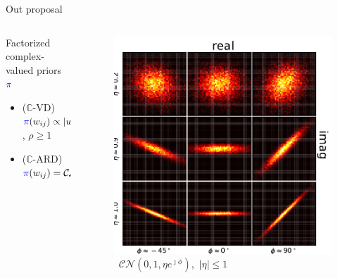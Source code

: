 \documentclass{beamer}
\newcommand{\cplx}{\mathbb{C}}
\begin{document}
\begin{frame}[c]{\insertsection}{Out proposal}
  \pause
  \bigskip
  \begin{columns}[T]
    \begin{column}{0.60\linewidth}
      Factorized complex-valued priors ${\color{blue} \pi}$
      \begin{itemize}
        \item ($\cplx$-VD) $
          {\color{blue} \pi}(w_{ij})
              \propto \lvert w_{ij}\rvert^{-\rho}
        $, $\rho \geq 1$
        \smallskip
        \item ($\cplx$-ARD) $
          {\color{blue} \pi}(w_{ij})
              = \mathcal{CN}(
                0, \tfrac1{{\color{teal} \tau_{ij}}}, 0
              )
        $
      \end{itemize}
    \end{column}
    \begin{column}{0.30\linewidth}
      \begin{figure}
        \centering
        \includegraphics[width=1.2\linewidth]{figure__cplx_gaussian.pdf}
        \quad\mbox{
          \scriptsize
          $\mathcal{CN}(0, 1, \eta e^{\jmath \phi})$, $\lvert \eta \rvert \leq 1$
        }
      \end{figure}
    \end{column}
  \end{columns}

\end{frame}
\end{document}
